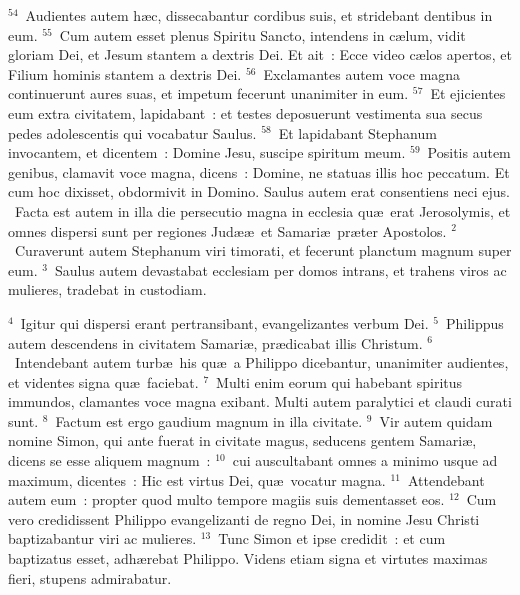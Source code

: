 ${}^{54}$~Audientes autem h\ae c, dissecabantur cordibus suis, et stridebant dentibus in eum.
${}^{55}$~Cum autem esset plenus Spiritu Sancto, intendens in c\ae lum, vidit gloriam Dei, et Jesum stantem a dextris Dei. Et ait~: Ecce video c\ae los apertos, et Filium hominis stantem a dextris Dei.
${}^{56}$~Exclamantes autem voce magna continuerunt aures suas, et impetum fecerunt unanimiter in eum.
${}^{57}$~Et ejicientes eum extra civitatem, lapidabant~: et testes deposuerunt vestimenta sua secus pedes adolescentis qui vocabatur Saulus.
${}^{58}$~Et lapidabant Stephanum invocantem, et dicentem~: Domine Jesu, suscipe spiritum meum.
${}^{59}$~Positis autem genibus, clamavit voce magna, dicens~: Domine, ne statuas illis hoc peccatum. Et cum hoc dixisset, obdormivit in Domino. Saulus autem erat consentiens neci ejus.
~\lettrine[lines=10,image=true,loversize=0.05,lraise=-0.03]{F}{}acta est autem in illa die persecutio magna in ecclesia qu\ae\ erat Jerosolymis, et omnes dispersi sunt per regiones Jud\ae \ae\ et Samari\ae\ pr\ae ter Apostolos.
${}^{2}$~Curaverunt autem Stephanum viri timorati, et fecerunt planctum magnum super eum.
${}^{3}$~Saulus autem devastabat ecclesiam per domos intrans, et trahens viros ac mulieres, tradebat in custodiam.


${}^{4}$~Igitur qui dispersi erant pertransibant, evangelizantes verbum Dei.
${}^{5}$~Philippus autem descendens in civitatem Samari\ae , pr\ae dicabat illis Christum.
${}^{6}$~Intendebant autem turb\ae\ his qu\ae\ a Philippo dicebantur, unanimiter audientes, et videntes signa qu\ae\ faciebat.
${}^{7}$~Multi enim eorum qui habebant spiritus immundos, clamantes voce magna exibant. Multi autem paralytici et claudi curati sunt.
${}^{8}$~Factum est ergo gaudium magnum in illa civitate.
${}^{9}$~Vir autem quidam nomine Simon, qui ante fuerat in civitate magus, seducens gentem Samari\ae , dicens se esse aliquem magnum~:
${}^{10}$~cui auscultabant omnes a minimo usque ad maximum, dicentes~: Hic est virtus Dei, qu\ae\ vocatur magna.
${}^{11}$~Attendebant autem eum~: propter quod multo tempore magiis suis dementasset eos.
${}^{12}$~Cum vero credidissent Philippo evangelizanti de regno Dei, in nomine Jesu Christi baptizabantur viri ac mulieres.
${}^{13}$~Tunc Simon et ipse credidit~: et cum baptizatus esset, adh\ae rebat Philippo. Videns etiam signa et virtutes maximas fieri, stupens admirabatur.


